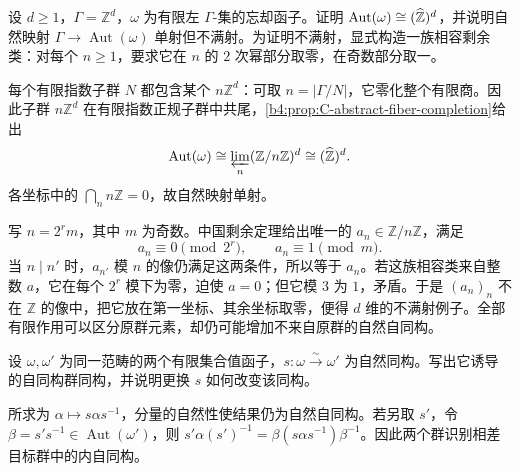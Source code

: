\begin{exercise}\label{b4:ex:C-fiber-profinite-completion}
	设 \(d\ge1\)，\(\Gamma=\mathbb Z^d\)，\(\omega\) 为有限左 \(\Gamma\)-集的忘却函子。证明 \(\operatorname{Aut}(\omega)\cong(\widehat{\vphantom{Z}\mathbb Z})^d\)，并说明自然映射 \(\Gamma\to\operatorname{Aut}(\omega)\) 单射但不满射。为证明不满射，显式构造一族相容剩余类：对每个 \(n\ge1\)，要求它在 \(n\) 的 \(2\) 次幂部分取零，在奇数部分取一。
\end{exercise}
\begin{solution}
	每个有限指数子群 \(N\) 都包含某个 \(n\mathbb Z^d\)：可取 \(n=|\Gamma/N|\)，它零化整个有限商。因此子群 \(n\mathbb Z^d\) 在有限指数正规子群中共尾，\cref{b4:prop:C-abstract-fiber-completion}给出
	\[
		\operatorname{Aut}(\omega)\cong\varprojlim_n(\mathbb Z/n\mathbb Z)^d \cong(\widehat{\vphantom{Z}\mathbb Z})^d.
	\]
	各坐标中的 \(\bigcap_n n\mathbb Z=0\)，故自然映射单射。

	写 \(n=2^r m\)，其中 \(m\) 为奇数。中国剩余定理给出唯一的 \(a_n\in\mathbb Z/n\mathbb Z\)，满足
	\[
		a_n\equiv0\pmod{2^r},\qquad a_n\equiv1\pmod m.
	\]
	当 \(n\mid n'\) 时，\(a_{n'}\) 模 \(n\) 的像仍满足这两条件，所以等于 \(a_n\)。若这族相容类来自整数 \(a\)，它在每个 \(2^r\) 模下为零，迫使 \(a=0\)；但它模 \(3\) 为 \(1\)，矛盾。于是 \((a_n)_n\) 不在 \(\mathbb Z\) 的像中，把它放在第一坐标、其余坐标取零，便得 \(d\) 维的不满射例子。全部有限作用可以区分原群元素，却仍可能增加不来自原群的自然自同构。
\end{solution}

\begin{exercise}\label{b4:ex:C-fiber-conjugation}
	设 \(\omega,\omega'\) 为同一范畴的两个有限集合值函子，\(s:\omega\xrightarrow{\sim}\omega'\) 为自然同构。写出它诱导的自同构群同构，并说明更换 \(s\) 如何改变该同构。
\end{exercise}
\begin{solution}
	所求为 \(\alpha\mapsto s\alpha s^{-1}\)，分量的自然性使结果仍为自然自同构。若另取 \(s'\)，令 \(\beta=s's^{-1}\in\operatorname{Aut}(\omega')\)，则 \(s'\alpha(s')^{-1}=\beta(s\alpha s^{-1})\beta^{-1}\)。因此两个群识别相差目标群中的内自同构。
\end{solution}
